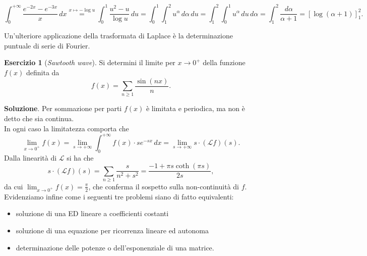 \documentclass[a4paper,twoside]{article}
\theoremstyle{definition}
\newtheorem{ex}[theorem]{Esercizio}
\numberwithin{theorem}{section}
\begin{document}
$$ \int_{0}^{+\infty}\frac{e^{-2x}-e^{-3x}}{x}\,dx \stackrel{x\mapsto -\log u}{=}\int_{0}^{1}\frac{u^2-u}{\log u}\,du=\int_{0}^{1}\int_{1}^{2}u^\alpha\,d\alpha\,du = \int_{1}^{2}\int_{0}^{1}u^\alpha\,du\,d\alpha = \int_{1}^{2}\frac{d\alpha}{\alpha+1}=\left[\log(\alpha+1)\right]_{1}^{2}. $$

Un'ulteriore applicazione della trasformata di Laplace è la determinazione puntuale di serie di Fourier.
\begin{ex}[\emph{Sawtooth wave}] Si determini il limite per $x\to 0^+$ della funzione $f(x)$ definita da
$$ f(x) = \sum_{n\geq 1}\frac{\sin(nx)}{n}. $$
\end{ex}
\textbf{Soluzione}. Per sommazione per parti $f(x)$ è limitata e periodica, ma non è detto che sia continua.\\ In ogni caso la limitatezza comporta che 
$$ \lim_{x\to 0^+}f(x) = \lim_{s\to +\infty}\int_{0}^{+\infty}f(x)\cdot s e^{-sx}\,dx = \lim_{s\to +\infty} s\cdot(\mathcal{L} f)(s). $$
Dalla linearità di $\mathcal{L}$ si ha che 
$$ s\cdot(\mathcal{L}f)(s) = \sum_{n\geq 1}\frac{s}{n^2+s^2} = \frac{-1+\pi s\coth(\pi s)}{2s},$$
da cui $\lim_{x\to 0^+}f(x)=\frac{\pi}{2}$, che conferma il sospetto sulla non-continuità di $f$.\\

Evidenziamo infine come i seguenti tre problemi siano di fatto equivalenti:
\begin{itemize}
 \item soluzione di una ED lineare a coefficienti costanti 
 \item soluzione di una equazione per ricorrenza lineare ed autonoma
 \item determinazione delle potenze o dell'esponenziale di una matrice.
\end{itemize}
\end{document}
